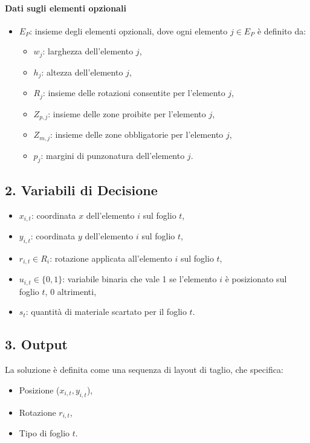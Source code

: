 \paragraph*{Dati sugli elementi opzionali}  
\begin{itemize}
    \item \( E_P \): insieme degli elementi opzionali, dove ogni elemento \( j \in E_P \) è definito da:
    \begin{itemize}
        \item \( w_j \): larghezza dell’elemento \( j \),
        \item \( h_j \): altezza dell’elemento \( j \),
        \item \( R_j \): insieme delle rotazioni consentite per l’elemento \( j \),
        \item \( Z_{p,j} \): insieme delle zone proibite per l’elemento \( j \),
        \item \( Z_{m,j} \): insieme delle zone obbligatorie per l’elemento \( j \),
        \item \( p_j \): margini di punzonatura dell’elemento \( j \).
    \end{itemize}
\end{itemize}

\subsection*{2. Variabili di Decisione}
\begin{itemize}
    \item \( x_{i,t} \): coordinata \( x \) dell’elemento \( i \) sul foglio \( t \),
    \item \( y_{i,t} \): coordinata \( y \) dell’elemento \( i \) sul foglio \( t \),
    \item \( r_{i,t} \in R_i \): rotazione applicata all’elemento \( i \) sul foglio \( t \),
    \item \( u_{i,t} \in \{0,1\} \): variabile binaria che vale 1 se l’elemento \( i \) è posizionato sul foglio \( t \), 0 altrimenti,
    \item \( s_t \): quantità di materiale scartato per il foglio \( t \).
\end{itemize}

\subsection*{3. Output}
La soluzione è definita come una sequenza di layout di taglio, che specifica:
\begin{itemize}
    \item Posizione (\( x_{i,t}, y_{i,t} \)),
    \item Rotazione \( r_{i,t} \),
    \item Tipo di foglio \( t \).
\end{itemize}

